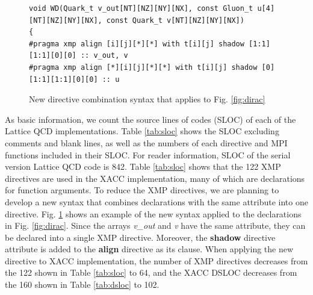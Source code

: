 \begin{figure}[h]
\centering
\begin{lstlisting}
void WD(Quark_t v_out[NT][NZ][NY][NX], const Gluon_t u[4][NT][NZ][NY][NX], const Quark_t v[NT][NZ][NY][NX])
{
#pragma xmp align [i][j][*][*] with t[i][j] shadow [1:1][1:1][0][0] :: v_out, v
#pragma xmp align [*][i][j][*][*] with t[i][j] shadow [0][1:1][1:1][0][0] :: u
\end{lstlisting}
\caption{New directive combination syntax that applies to Fig. \ref{fig:dirac}}\label{fig:combine}
\end{figure}

As basic information,
we count the source lines of codes (SLOC) of each of the Lattice QCD implementations.
Table \ref{tab:sloc} shows the SLOC excluding comments and blank lines,
as well as the numbers of each directive and MPI functions included in their SLOC.
For reader information,
SLOC of the serial version Lattice QCD code is 842.
Table \ref{tab:sloc} shows that
the 122 XMP directives are used in the XACC implementation,
many of which are declarations for function arguments.
To reduce the XMP directives,
we are planning to develop a new syntax that combines declarations with the same attribute into one directive.
Fig. \ref{fig:combine} shows an example of the new syntax applied to the declarations in Fig. \ref{fig:dirac}.
Since the arrays {\it v\_out} and {\it v} have the same attribute,
they can be declared into a single XMP directive.
Moreover,
the {\bf shadow} directive attribute is added to the {\bf align} directive as its clause.
When applying the new directive to XACC implementation,
the number of XMP directives decreases from the 122 shown in Table \ref{tab:sloc} to 64,
and the XACC DSLOC decreases from the 160 shown in Table \ref{tab:dsloc} to 102.
